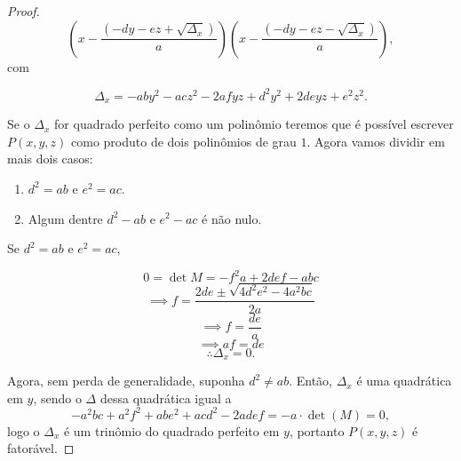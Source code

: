\begin{proof}
\[ \left(x - \frac{(-dy - ez + \sqrt{\Delta_x})}{a}\right)\left(x - \frac{(-dy - ez - \sqrt{\Delta_x})}{a}\right),\]
com 

\[\Delta_x =-aby^2 - acz^2 - 2afyz + d^2y^2 + 2deyz + e^2z^2.\]

Se o $\Delta_x$ for quadrado perfeito como um polinômio teremos que é possível escrever $P(x,y,z)$ como produto de dois polinômios de grau $1$. Agora vamos dividir em mais dois casos:

\begin{enumerate}
    \item $d^2 = ab$ e $e^2 = ac$.
    \item Algum dentre $d^2 - ab$ e $e^2 - ac$ é não nulo. 
\end{enumerate}
Se $d^2 = ab$ e $e^2 = ac$, 

\[0 = \det M = -f^2a + 2def - abc\]
\[\implies f = \dfrac{2de\pm \sqrt{4d^2e^2-4a^2bc}}{2a}\]
\[\implies f = \dfrac{de}{a}\]
\[\implies af = de\]
\[\therefore \Delta_x = 0.\]

Agora, sem perda de generalidade, suponha $d^2\ne ab$. Então, $\Delta_x$ é uma quadrática em $y$, sendo o $\Delta$ dessa quadrática igual a 
\[-a^2bc + a^2f^2 + abe^2 + acd^2 - 2adef = -a\cdot\det(M) = 0,\]
logo o $\Delta_x $ é um trinômio do quadrado perfeito em $y$, portanto $P(x,y,z)$ é fatorável.
\end{proof}